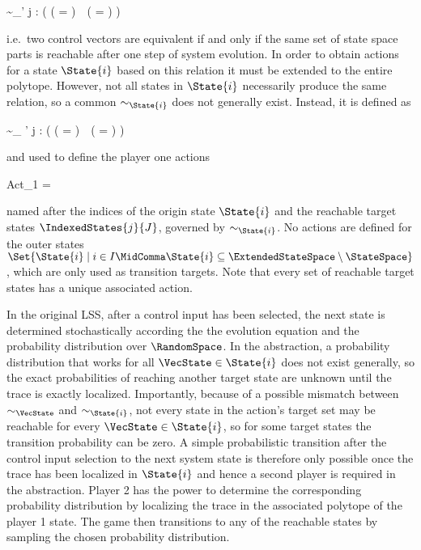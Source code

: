 \startformula
    \VecControl \sim_\VecState \VecControl' \;\Longleftrightarrow\;
    \forall j \in \StateIndices: \Big(
        ( \Posterior{\VecState}{\VecControl} \cap {} = \emptyset ) \,\leftrightarrow\,
        (  \cap {} = \emptyset )
    \Big) \EndComma
\stopformula

i.e.\ two control vectors are equivalent if and only if the same set of state space parts is reachable after one step of system evolution.
In order to obtain actions for a state $\State{i}$ based on this relation it must be extended to the entire polytope.
However, not all states in $\State{i}$ necessarily produce the same relation, so a common $\sim_{\State{i}}$ does not generally exist.
Instead, it is defined as

\startformula
    \VecControl \sim_{} \VecControl' \;\Longleftrightarrow\;
    \forall j \in \StateIndices: \Big(
        (  \cap {} = \emptyset ) \,\leftrightarrow\,
        (  \cap {} = \emptyset )
    \Big)
\stopformula

and used to define the player one actions

\startformula
    Act_1 =  \EndComma
\stopformula

named after the indices of the origin state $\State{i}$ and the reachable target states $\IndexedStates{j}{J}$, governed by $\sim_{\State{i}}$.
No actions are defined for the outer states $\Set{ \State{i} \mid i \in I \MidComma \State{i} \subseteq \ExtendedStateSpace \setminus \StateSpace }$, which are only used as transition targets.
Note that every set of reachable target states has a unique associated action.

In the original LSS, after a control input has been selected, the next state is determined stochastically according the the evolution equation and the probability distribution over $\RandomSpace$.
In the abstraction, a probability distribution that works for all $\VecState \in \State{i}$ does not exist generally, so the exact probabilities of reaching another target state are unknown until the trace is exactly localized.
Importantly, because of a possible mismatch between $\sim_\VecState$ and $\sim_{\State{i}}$, not every state in the action's target set may be reachable for every $\VecState \in \State{i}$, so for some target states the transition probability can be zero.
A simple probabilistic transition after the control input selection to the next system state is therefore only possible once the trace has been localized in $\State{i}$ and hence a second player is required in the abstraction.
Player 2 has the power to determine the corresponding probability distribution by localizing the trace in the associated polytope of the player 1 state.
The game then transitions to any of the reachable states by sampling the chosen probability distribution.

